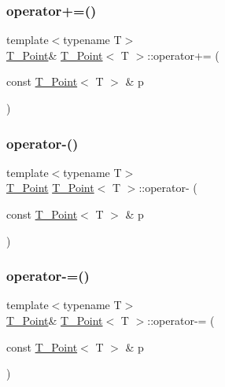 \mbox{\label{classT__Point_a4fa7b8ceb837c81e608d5ddad0f1ffe7}} 
\subsubsection{\texorpdfstring{operator+=()}{operator+=()}}
{\footnotesize\ttfamily template$<$typename T$>$ \\
\hyperlink{classT__Point}{T\+\_\+\+Point}\& \hyperlink{classT__Point}{T\+\_\+\+Point}$<$ T $>$\+::operator+= (\begin{DoxyParamCaption}\item[{const \hyperlink{classT__Point}{T\+\_\+\+Point}$<$ T $>$ \&}]{p }\end{DoxyParamCaption})\hspace{0.3cm}{\ttfamily [inline]}}

\mbox{\label{classT__Point_a4a3671d0a9763b3e749c799294ebb1ca}} 
\subsubsection{\texorpdfstring{operator-\/()}{operator-()}}
{\footnotesize\ttfamily template$<$typename T$>$ \\
\hyperlink{classT__Point}{T\+\_\+\+Point} \hyperlink{classT__Point}{T\+\_\+\+Point}$<$ T $>$\+::operator-\/ (\begin{DoxyParamCaption}\item[{const \hyperlink{classT__Point}{T\+\_\+\+Point}$<$ T $>$ \&}]{p }\end{DoxyParamCaption})\hspace{0.3cm}{\ttfamily [inline]}}

\mbox{\label{classT__Point_aa438de3090999e1f24f0de58dc5171a0}} 
\subsubsection{\texorpdfstring{operator-\/=()}{operator-=()}}
{\footnotesize\ttfamily template$<$typename T$>$ \\
\hyperlink{classT__Point}{T\+\_\+\+Point}\& \hyperlink{classT__Point}{T\+\_\+\+Point}$<$ T $>$\+::operator-\/= (\begin{DoxyParamCaption}\item[{const \hyperlink{classT__Point}{T\+\_\+\+Point}$<$ T $>$ \&}]{p }\end{DoxyParamCaption})\hspace{0.3cm}{\ttfamily [inline]}}

